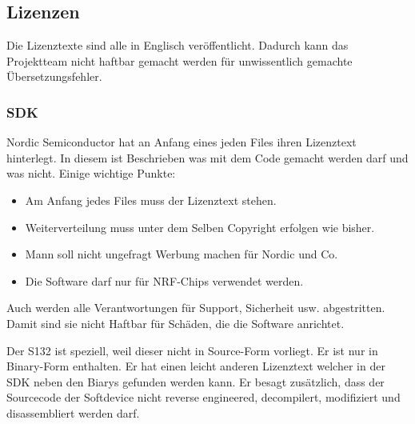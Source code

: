 \subsection{Lizenzen}\label{sec:lizenzen}
Die Lizenztexte sind alle in Englisch veröffentlicht. Dadurch kann das Projektteam nicht haftbar gemacht werden für unwissentlich gemachte Übersetzungsfehler.

\subsubsection*{SDK}
Nordic Semiconductor hat an Anfang eines jeden Files ihren Lizenztext \cite{nordic_sdk_license} hinterlegt. In diesem ist Beschrieben was mit dem Code gemacht werden darf und was nicht. Einige wichtige Punkte:

\begin{itemize}
	\item Am Anfang jedes Files muss der Lizenztext stehen.
	\item Weiterverteilung muss unter dem Selben Copyright erfolgen wie bisher.
	\item Mann soll nicht ungefragt Werbung machen für Nordic und Co.
	\item Die Software darf nur für NRF-Chips verwendet werden.
\end{itemize}

Auch werden alle Verantwortungen für Support, Sicherheit usw. abgestritten. Damit sind sie nicht Haftbar für Schäden, die die Software anrichtet.

Der S132 ist speziell, weil dieser nicht in Source-Form vorliegt. Er ist nur in Binary-Form enthalten. Er hat einen leicht anderen Lizenztext welcher in der SDK neben den Biarys gefunden werden kann. Er besagt zusätzlich, dass der Sourcecode der Softdevice nicht reverse engineered, decompilert, modifiziert und disassembliert werden darf.
